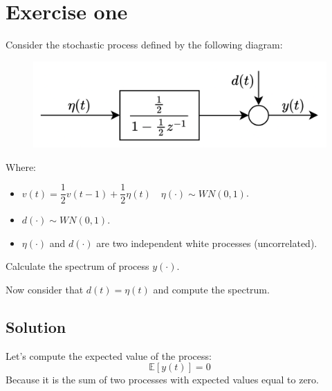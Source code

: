 \section{Exercise one}

Consider the stochastic process defined by the following diagram:
\begin{figure}[H]
    \centering
    \includegraphics[width=0.5\linewidth]{images/21.png}
\end{figure}
Where: 
\begin{itemize}
    \item $v(t) = \dfrac{1}{2} v(t-1) + \dfrac{1}{2} \eta(t) \quad \eta(\cdot) \sim WN(0, 1)$.
    \item $d(\cdot) \sim WN(0, 1) $.
    \item $\eta(\cdot)$ and $d(\cdot)$ are two independent white processes (uncorrelated).
\end{itemize}
Calculate the spectrum of process $y(\cdot)$.

Now consider that $d(t) = \eta(t)$ and compute the spectrum.

\subsection{Solution}
Let's compute the expected value of the process:
\[\mathbb{E}\left[ y(t) \right]=0\]
Because it is the sum of two processes with expected values equal to zero.

